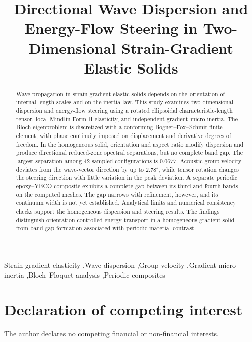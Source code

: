 \documentclass[preprint,12pt,authoryear]{elsarticle}
\begin{document}
\begin{frontmatter}
\title{Directional Wave Dispersion and Energy-Flow Steering in Two-Dimensional Strain-Gradient Elastic Solids}
\begin{abstract}
Wave propagation in strain-gradient elastic solids depends on the orientation of internal length scales and on the inertia law. This study examines two-dimensional dispersion and energy-flow steering using a rotated ellipsoidal characteristic-length tensor, local Mindlin Form-II elasticity, and independent gradient micro-inertia. The Bloch eigenproblem is discretized with a conforming Bogner--Fox--Schmit finite element, with phase continuity imposed on displacement and derivative degrees of freedom. In the homogeneous solid, orientation and aspect ratio modify dispersion and produce directional reduced-zone spectral separations, but no complete band gap. The largest separation among 42 sampled configurations is 0.0677. Acoustic group velocity deviates from the wave-vector direction by up to $2.78^\circ$, while tensor rotation changes the steering direction with little variation in the peak deviation. A separate periodic epoxy--YBCO composite exhibits a complete gap between its third and fourth bands on the computed meshes. The gap narrows with refinement, however, and its continuum width is not yet established. Analytical limits and numerical consistency checks support the homogeneous dispersion and steering results. The findings distinguish orientation-controlled energy transport in a homogeneous gradient solid from band-gap formation associated with periodic material contrast.
\end{abstract}
\begin{keyword}
Strain-gradient elasticity \sep Wave dispersion \sep Group velocity \sep Gradient micro-inertia \sep Bloch--Floquet analysis \sep Periodic composites
\end{keyword}
\end{frontmatter}
\let\cite\citep









\section*{Declaration of competing interest}
The author declares no competing financial or non-financial interests.
\appendix
\renewcommand{\thesection}{\Alph{section}}





\end{document}
